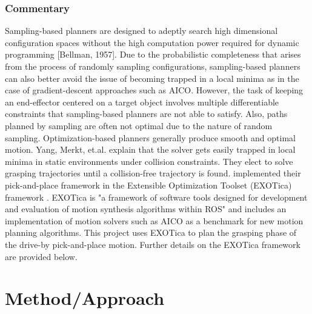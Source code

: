 \documentclass[12pt]{article}
\begin{document}
        \subsubsection{Commentary}
            \par Sampling-based planners are designed to adeptly search high dimensional configuration spaces without the high computation power required for dynamic programming [Bellman, 1957]. Due to the probabilistic completeness that arises from the process of randomly sampling configurations, sampling-based planners can also better avoid the issue of becoming trapped in a local minima as in the case of gradient-descent approaches such as AICO. However, the task of keeping an end-effector centered on a target object involves multiple differentiable constraints that sampling-based planners are not able to satisfy. Also, paths planned by sampling are often not optimal due to the nature of random sampling. Optimization-based planners generally produce smooth and optimal motion.
            Yang, Merkt, et.al. explain that the solver gets easily trapped in local minima in static environments under collision constraints. They elect to solve grasping trajectories until a collision-free trajectory is found. \cite{yang_planning_2018} implemented their pick-and-place framework in the Extensible Optimization Toolset (EXOTica) framework \cite{koubaa_exotica_2019}. EXOTica is "a framework of software tools designed for development and evaluation of motion synthesis algorithms within ROS" and includes an implementation of motion solvers such as AICO as a benchmark for new motion planning algorithms.\cite{koubaa_exotica_2019} This project uses EXOTica to plan the grasping phase of the drive-by pick-and-place motion. Further details on the EXOTica framework are provided below.
    \newpage
    \section{Method/Approach}
\end{document}
